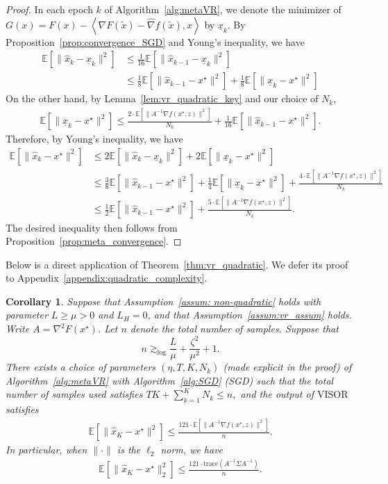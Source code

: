 \documentclass[11pt,twoside]{article}
\numberwithin{equation}{section}
\newcommand{\EE}{\mathbb{E}}
\newcommand{\trace}[1]{\mathrm{trace}\left(#1\right)}
\newcommand{\1}{\mathbf{1}}
\newcommand{\dotp}[1]{\left\langle #1\right\rangle}
\newtheorem{corollary}[theorem]{Corollary}
\theoremstyle{remark}
\theoremstyle{plain}
\newcommand{\liph}{L_H}
\newcommand{\algname}{\mathrm{VISOR}}
\begin{document}
\begin{proof}
In each epoch $k$ of Algorithm~\ref{alg:metaVR}, we denote the minimizer of $G(x) = F(x) - \dotp{\nabla F(\tilde x) - \widehat \nabla f(\tilde x), x}$ by $\underline{x}_k$. 
By Proposition~\ref{prop:convergence_SGD} and Young's inequality, we have 
\begin{align*}
	\EE[\|\widehat x_k - \underline{x}_k\|^2] &\le \frac{1}{16} \EE[\|\widehat x_{k-1} - \underline{x}_k\|^2] \\
	&\le \frac{1}{8} \EE[\|\widehat x_{k-1} - x^\star\|^2] + \frac{1}{8} \EE[\| \underline{x}_k - x^\star\|^2]
\end{align*}
On the other hand, by Lemma~\ref{lem:vr_quadratic_key} and our choice of $N_k$,
\begin{align*}
	\EE[\|\underline{x}_k - x^\star\|^2] \le \frac{2 \cdot \EE[\|A^{-1} \nabla f(x^\star, z)\|^2]}{N_k} + \frac{1}{16} \EE[\|\widehat x_{k-1} - x^\star\|^2].
\end{align*}
Therefore, by Young's inequality, we have
\begin{align*}
	\EE[\|\widehat x_k - x^\star\|^2] &\le 2 \EE[\|\widehat x_k - \underline{x}_k\|^2] + 2 \EE[ \|\underline{x}_k - x^\star\|^2] \\
	&\le \frac{3}{8} \EE[\|\widehat x_{k-1} - x^\star\|^2] + \frac{1}{4}\EE[\|\underline{x}_k - x^\star\|^2 ] + \frac{4 \cdot \EE[\|A^{-1} \nabla f(x^\star, z)\|^2]}{N_k}\\
	&\le \frac{1}{2} \EE[\|\widehat x_{k-1} - x^\star\|^2] + \frac{5 \cdot \EE[\|A^{-1} \nabla f(x^\star, z)\|^2]}{N_k} .
\end{align*}
The desired inequality then follows from Proposition~\ref{prop:meta_convergence}.  
\end{proof}
Below is a direct application of Theorem~\ref{thm:vr_quadratic}. We defer its proof to Appendix~\ref{appendix:quadratic_complexity}.
\begin{corollary}\label{cor:quadratic_complexity}
Suppose that  Assumption~\ref{assum: non-quadratic} holds with parameter $L \ge \mu >0$ and $\liph = 0$, and that Assumption~\ref{assum:vr_assum}  holds.  Write $A = \nabla^2 F(x^\star)$. Let $n$ denote the total number of samples. Suppose that $$n \gtrsim_{\log} \frac{L}{\mu} + \frac{\zeta^2}{\mu^2} + 1.$$ 	There exists a choice of parameters $(\eta, T, K, N_k)$ (made explicit in the proof) of Algorithm~\ref{alg:metaVR} with Algorithm~\ref{alg:SGD} (SGD) such that the total number of samples used satisfies 
$TK + \sum_{k=1}^{K} N_k \le n,$
and the output of $\algname$ satisfies
\begin{align*}
	\EE[\|\widehat x_K - x^\star\|^2] \le \frac{121 \cdot  \EE[\|A^{-1} \nabla f(x^\star, z)\|^2]}{n}.
\end{align*}
In particular, when $\|\cdot\|$ is the $\ell_2$ norm, we have 
\begin{align}\label{eqn:upper_bound_quadratic_SGD}
	\EE[\|\widehat x_K - x^\star\|_2^2] \le   \frac{121 \cdot\trace{A^{-1}\Sigma A^{-1}}}{n} .
\end{align}
\end{corollary}
\end{document}
